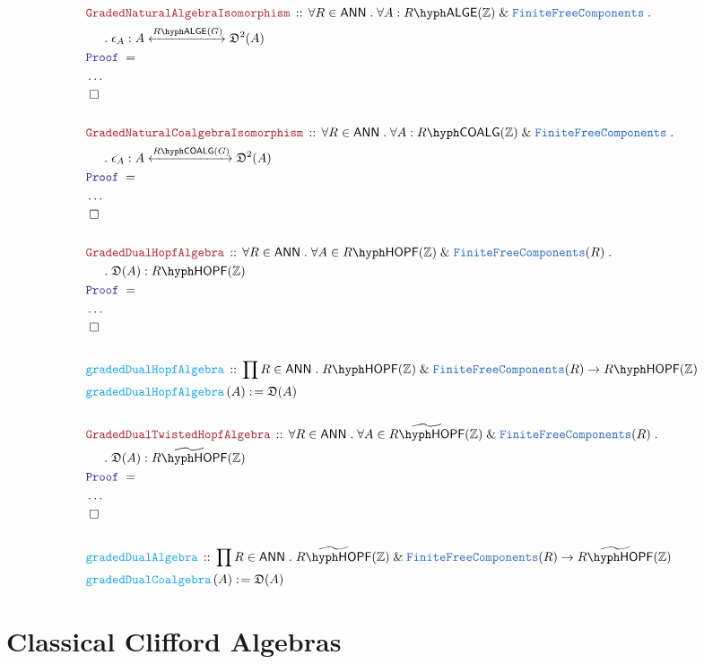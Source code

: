 \documentclass[12pt]{scrartcl}%
\newcommand{\TYPE}[1]{\textcolor{NavyBlue}{\mathtt{#1}}}%
\newcommand{\FUNC}[1]{\textcolor{Cerulean}{\mathtt{#1}}}%
\newcommand{\LOGIC}[1]{\textcolor{Blue}{\mathtt{#1}}}%
\newcommand{\THM}[1]{\textcolor{Maroon}{\mathtt{#1}}}%
\renewcommand{\.}{\; . \;} %
\newcommand{\de}{: \kern 0.1pc =} %
\newcommand{\Act}[1]{\left( #1 \right)} %
\newcommand{\Theorem}[2]{& \THM{#1} \, :: \, #2 \\ & \Proof = \\ } %
\newcommand{\DeclareFunc}[2]{& \FUNC{#1} \, :: \, #2 \\}%
\newcommand{\DefineFunc}[3]{&  \FUNC{#1}\Act{#2} \de #3 \\}%
\newcommand{\NewLine}{\\ & \kern 1pc}%
\newcommand{\Page}[1]{ \begin{align*} #1 \end{align*}  }%
\newcommand{\NoProof}{ & \ldots \\ \EndProof}%
\renewcommand{\And}{\; \& \;}%
\newcommand{\Int}{\mathbb{Z}}%
\newcommand{\QED}{\; \square} %
\newcommand{\EndProof}{& \QED \\} %
\newcommand{\Proof}{\LOGIC{Proof} \; } %
\newcommand{\ToIso}[1]{\xleftrightarrow{#1}}%
\newcommand{\ANN}{\mathsf{ANN}} %
\newcommand{\LALGE}[1]{#1\hyph\mathsf{ALGE}}%
\newcommand{\COALG}[1]{#1\hyph\mathsf{COALG}}%
\newcommand{\HOPF}[1]{#1\hyph\mathsf{HOPF}}%
\begin{document}
\Page{
	\Theorem{GradedNaturalAlgebraIsomorphism}
	{
		\forall R \in \ANN \.
		\forall A : \LALGE{R}(\Int) \And \TYPE{FiniteFreeComponents} \.
		\NewLine \. 
		\epsilon_A : A \ToIso{\LALGE{R}(G)} \mathfrak{D}^2(A) 
	}
	\NoProof
	\\
	\Theorem{GradedNaturalCoalgebraIsomorphism}
	{
		\forall R \in \ANN \.
		\forall A : \COALG{R}(\Int) \And \TYPE{FiniteFreeComponents} \.
		\NewLine \. 
		\epsilon_A : A \ToIso{\COALG{R}(G)} \mathfrak{D}^2(A) 
	}
	\NoProof
	\\
	\Theorem{GradedDualHopfAlgebra}{
		\forall R \in \ANN \.
		\forall A \in \HOPF{R}(\Int) \And \TYPE{FiniteFreeComponents}(R) \.
		\NewLine \. \mathfrak{D}(A) : \HOPF{R}(\Int) 
	}
	\NoProof
	\\
	\DeclareFunc{gradedDualHopfAlgebra}{
		\prod R \in \ANN \.
		\HOPF{R}(\Int) \And \TYPE{FiniteFreeComponents}(R) \to
		\HOPF{R}(\Int)
	}
	\DefineFunc{gradedDualHopfAlgebra}{A}{ \mathfrak{D}(A) }
	\\
	\Theorem{GradedDualTwistedHopfAlgebra}{
		\forall R \in \ANN \.
		\forall A \in \widetilde{\HOPF{R}}(\Int) \And \TYPE{FiniteFreeComponents}(R) \.
		\NewLine \. \mathfrak{D}(A) : \widetilde{\HOPF{R}}(\Int) 
	}
	\NoProof
	\\
	\DeclareFunc{gradedDualAlgebra}{
		\prod R \in \ANN \.
		\widetilde{\HOPF{R}}(\Int) \And \TYPE{FiniteFreeComponents}(R) \to
		\widetilde{\HOPF{R}}(\Int)
	}
	\DefineFunc{gradedDualCoalgebra}{A}{\mathfrak{D}(A)}
}
\newpage
\section{Classical Clifford Algebras} 
\end{document}
